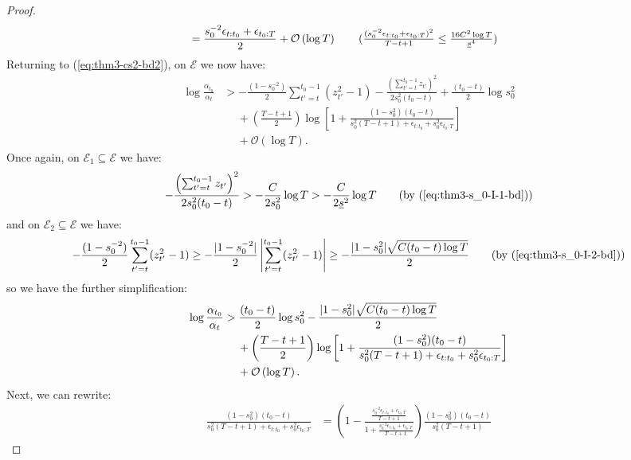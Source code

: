 \begin{proof}
\begin{align*}
    &= \frac{s_0^{-2}\epsilon_{t:t_0} + \epsilon_{t_0:T}}{2} + \mathcal{O}\left(\log T\right) \tag{$\frac{(s_0^{-2} \epsilon_{t:t_0} + \epsilon_{t_0:T})^2}{T-t+1} \leq \frac{16C^2\log T}{\underline{s}^{4}}$}
\end{align*}
Returning to (\ref{eq:thm3-cs2-bd2}), on $\mathcal{E}$ we now have:
\begin{align*}
    \log \frac{\alpha_{t_0}}{\alpha_t} &> - \frac{(1-s_0^{-2})}{2} \sum_{t' = t}^{t_0 - 1} (z_{t'}^2-1) - \frac{\left(\sum_{t'=t}^{t_0-1 } z_{t'}\right)^2}{2s_0^2(t_0-t)} + \frac{(t_0-t)}{2}\log s_0^2  \\
    &\quad\: + \left(\frac{T - t +1}{2}\right)\log\left[1 + \frac{(1 - s_0^2)(t_0 - t)}{s_0^{2}(T-t+1) + \epsilon_{t:t_0} + s_0^{2}\epsilon_{t_0:T} }\right]  \\
    &\quad\: +\mathcal{O}\left(\log T\right). 
\end{align*}
Once again, on $\mathcal{E}_1 \subseteq \mathcal{E}$ we have:
\begin{align*}
    - \frac{\left(\sum_{t'=t}^{t_0-1 } z_{t'}\right)^2}{2s_0^2(t_0-t)} > - \frac{C}{2s_0^2} \log T > - \frac{C}{2\underline{s}^2} \log T \tag{by (\ref{eq:thm3-s_0-I-1-bd})}
\end{align*}
and on $\mathcal{E}_2 \subseteq \mathcal{E}$ we have: 
\begin{align*}
    - \frac{(1-s_0^{-2})}{2} \sum_{t' = t}^{t_0 - 1} (z_{t'}^2-1) \geq - \frac{|1-s_0^{-2}|}{2} \left|\sum_{t' = t}^{t_0 - 1} (z_{t'}^2-1)\right| \geq - \frac{|1 - s_0^2|\sqrt{C(t_0-t)\log T}}{2} \tag{by (\ref{eq:thm3-s_0-I-2-bd})}
\end{align*}
so we have the further simplification:
\begin{align*}
    \log \frac{\alpha_{t_0}}{\alpha_t} &> \frac{(t_0-t)}{2}\log s_0^2  - \frac{|1 - s_0^2|\sqrt{C(t_0-t)\log T}}{2} \notag \\
    &\quad\: + \left(\frac{T - t +1}{2}\right)\log\left[1 + \frac{(1 - s_0^2)(t_0 - t)}{s_0^{2}(T-t+1) + \epsilon_{t:t_0} + s_0^{2}\epsilon_{t_0:T} }\right] \notag \\
    &\quad\: + \mathcal{O}\left(\log T\right). 
\end{align*}
Next, we can rewrite:
\begin{align*}
    \frac{(1 - s_0^2)(t_0 - t)}{s_0^{2}(T-t+1) + \epsilon_{t:t_0} + s_0^{2}\epsilon_{t_0:T}} &= \left(1 - \frac{\frac{s_0^{-2}\epsilon_{t:t_0} + \epsilon_{t_0:T}}{T-t+1}}{1 + \frac{s_0^{-2}\epsilon_{t:t_0} + \epsilon_{t_0:T}}{T-t+1}}\right)\frac{(1 - s_0^2)(t_0 - t)}{s_0^{2}(T-t+1)}
\end{align*}

\end{proof}
